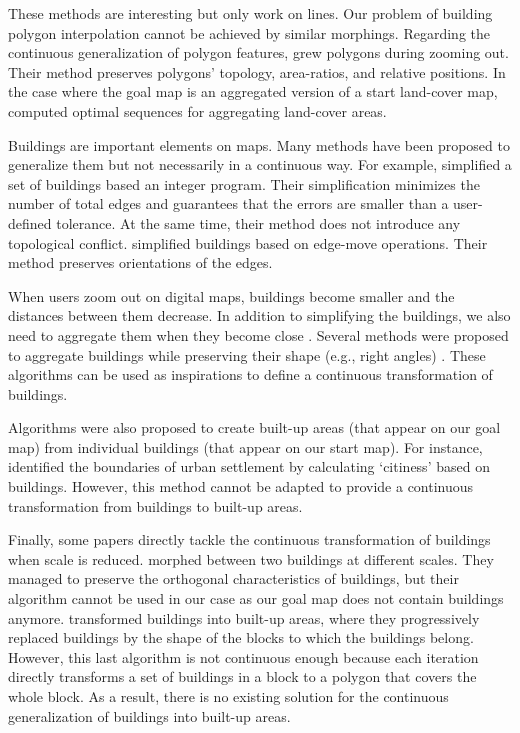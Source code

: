 These methods are interesting but only work on lines. 
Our problem of building polygon interpolation 
cannot be achieved by similar morphings. 
Regarding the continuous generalization of polygon features,
\citet{Danciger2009} grew polygons during zooming out. 
Their method preserves polygons' 
topology, area-ratios, and relative positions.  
In the case where the goal map is an aggregated version of 
a start land-cover map, 
\citet{Peng2017AStar} computed optimal sequences 
for aggregating land-cover areas.

Buildings are important elements on maps. 
Many methods have been proposed to generalize them 
but not necessarily in a continuous way.
For example, \citet{Haunertwolff2010Building} simplified a set 
of buildings based an integer program.
Their simplification minimizes the number of total edges and guarantees that the errors are smaller than 
a user-defined tolerance.
At the same time, their method does not introduce any topological conflict.
\citet{Buchin2011_Simp} simplified buildings based on 
edge-move operations.
Their method preserves orientations of the edges.

When users zoom out on digital maps, 
buildings become smaller and 
the distances between them decrease. 
In addition to simplifying the buildings,
we also need to aggregate them when they become close  \cite{Weibel1997}. 
Several methods were proposed 
to aggregate buildings while preserving their shape 
(e.g., right angles) 
\citep{Regnauld2001,RegnauldRevell07,Damen2008}. 
These algorithms can be used as inspirations 
to define a continuous transformation of buildings.

Algorithms were also proposed to create 
built-up areas (that appear on our goal map) from 
individual buildings (that appear on our start map). 
For instance, \citet{Chaudhry2008} identified 
the boundaries of urban settlement 
by calculating `citiness' based on buildings. 
However, this method cannot be adapted 
to provide a continuous transformation 
from buildings to built-up areas.

Finally, some papers directly tackle 
the continuous transformation of buildings 
when scale is reduced. 
\citet{Li2017_Building} morphed between two buildings 
at different scales.
They managed to preserve the orthogonal characteristics of 
buildings, but their algorithm cannot be used in our case 
as our goal map does not contain buildings anymore.
\citet{Touya2017Progressive} 
transformed buildings into built-up areas, 
where they progressively replaced buildings 
by the shape of the blocks to which the buildings belong. 
However, this last algorithm is not continuous enough 
because each iteration directly transforms 
a set of buildings in a block to a polygon 
that covers the whole block. 
As a result, there is no existing solution 
for the continuous generalization of buildings 
into built-up areas.


